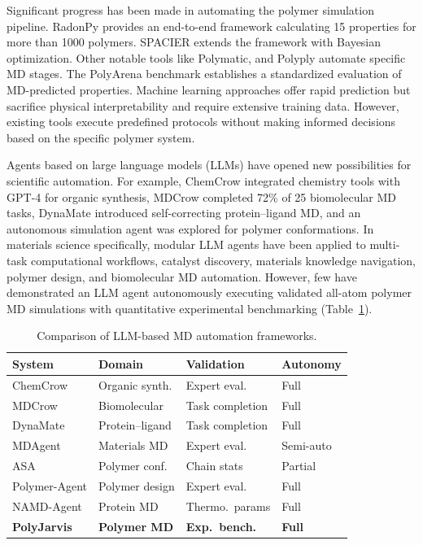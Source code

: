 \documentclass[journal=acsami,manuscript=article]{achemso}
\begin{document}
Significant progress has been made in automating the polymer simulation pipeline.
RadonPy\cite{hayashi2022radonpy} provides an end-to-end framework calculating 15 properties for more than 1000 polymers. SPACIER\cite{nanjo2025spacier} extends the framework with Bayesian optimization. Other notable tools like Polymatic,\cite{abbott2013polymatic} and Polyply\cite{grunewald2022polyply} automate specific MD stages. The PolyArena benchmark\cite{polyarena2025} establishes a standardized evaluation of MD-predicted properties.
Machine learning approaches offer rapid prediction but sacrifice physical interpretability and require extensive training data\cite{tao2021benchmarking, chaudhari2024alloybert}. However, existing tools execute predefined protocols without making informed decisions based on the specific polymer system.

Agents based on large language models (LLMs) have opened new possibilities for scientific automation.
For example, ChemCrow\cite{bran2024chemcrow} integrated chemistry tools with GPT-4 for organic synthesis, MDCrow\cite{campbell2025mdcrow} completed 72\% of 25 biomolecular MD tasks, DynaMate\cite{guilbert2025dynamate} introduced self-correcting protein--ligand MD, and an autonomous simulation agent was explored for polymer conformations.\cite{liu2025asa}
In materials science specifically, modular LLM agents have been applied to multi-task computational workflows,\cite{chaudhari2025modular} catalyst discovery,\cite{ock2026adsorb} materials knowledge navigation,\cite{zhuang2026natural} polymer design,\cite{nigam2026polymeragent} and biomolecular MD automation.\cite{chandrasekhar2025namdagent}
However, few have demonstrated an LLM agent autonomously executing validated all-atom polymer MD simulations with quantitative experimental benchmarking (Table~\ref{tab:comparison_agents}).

\begin{table}[ht]
\centering
\caption{Comparison of LLM-based MD automation frameworks.}
\label{tab:comparison_agents}
\small
\begin{tabular}{@{}llll@{}}
\toprule
\textbf{System} & \textbf{Domain} & \textbf{Validation} & \textbf{Autonomy} \\
\midrule
ChemCrow\cite{bran2024chemcrow} & Organic synth. & Expert eval. & Full \\
MDCrow\cite{campbell2025mdcrow} & Biomolecular & Task completion & Full \\
DynaMate\cite{guilbert2025dynamate} & Protein--ligand & Task completion & Full \\
MDAgent\cite{shi2025mdagent} & Materials MD & Expert eval. & Semi-auto \\
ASA\cite{liu2025asa} & Polymer conf. & Chain stats & Partial \\
Polymer-Agent\cite{nigam2026polymeragent} & Polymer design & Expert eval. & Full \\
NAMD-Agent\cite{chandrasekhar2025namdagent} & Protein MD & Thermo.\ params & Full \\
\textbf{PolyJarvis} & \textbf{Polymer MD} & \textbf{Exp.\ bench.} & \textbf{Full} \\
\bottomrule
\end{tabular}
\end{table}
\end{document}
